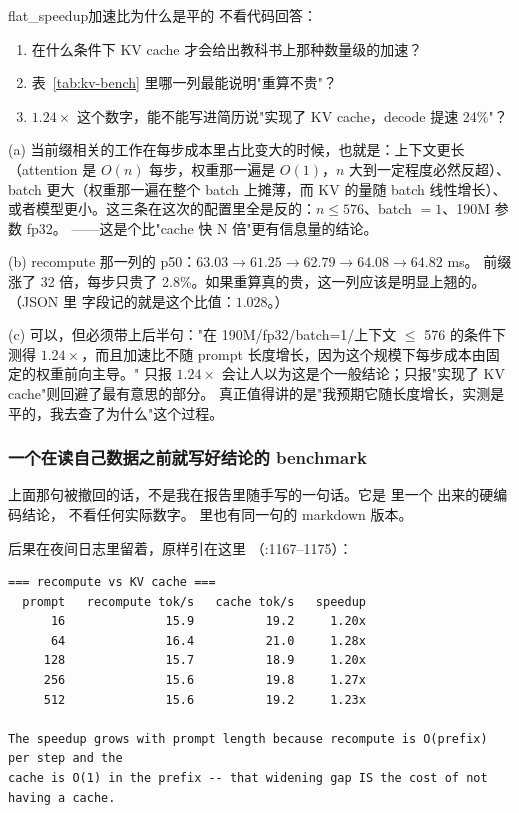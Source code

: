 \begin{checkpoint}{flat_speedup}{加速比为什么是平的}
不看代码回答：
\begin{enumerate}[label=(\alph*)]
  \item 在什么条件下 KV cache 才会给出教科书上那种数量级的加速？
  \item 表~\ref{tab:kv-bench} 里哪一列最能说明"重算不贵"？
  \item $1.24\times$ 这个数字，能不能写进简历说"实现了 KV cache，decode 提速 24\%"？
\end{enumerate}

\ifshowanswers
\tcblower
\answer (a) 当前缀相关的工作在每步成本里占比变大的时候，也就是：上下文更长
（attention 是 $O(n)$ 每步，权重那一遍是 $O(1)$，$n$ 大到一定程度必然反超）、
batch 更大（权重那一遍在整个 batch 上摊薄，而 KV 的量随 batch 线性增长）、
或者模型更小。这三条在这次的配置里全是反的：$n \le 576$、batch $=1$、190M 参数 fp32。
——这是个比"cache 快 N 倍"更有信息量的结论。

(b) recompute 那一列的 p50：$63.03 \to 61.25 \to 62.79 \to 64.08 \to 64.82$ ms。
前缀涨了 32 倍，每步只贵了 2.8\%。如果重算真的贵，这一列应该是明显上翘的。
（JSON 里  字段记的就是这个比值：$1.028$。）

(c) 可以，但必须带上后半句："在 190M/fp32/batch=1/上下文 $\le$ 576 的条件下测得
$1.24\times$，而且加速比不随 prompt 长度增长，因为这个规模下每步成本由固定的权重前向主导。"
只报 $1.24\times$ 会让人以为这是个一般结论；只报"实现了 KV cache"则回避了最有意思的部分。
真正值得讲的是"我预期它随长度增长，实测是平的，我去查了为什么"这个过程。
\fi
\end{checkpoint}

\subsubsection{一个在读自己数据之前就写好结论的 benchmark}

上面那句被撤回的话，不是我在报告里随手写的一句话。它是
 里一个 出来的硬编码结论，
不看任何实际数字。 里也有同一句的 markdown 版本。

后果在夜间日志里留着，原样引在这里
（:1167--1175）：

\begin{lstlisting}[style=hlshell]
=== recompute vs KV cache ===
  prompt   recompute tok/s   cache tok/s   speedup
      16              15.9          19.2     1.20x
      64              16.4          21.0     1.28x
     128              15.7          18.9     1.20x
     256              15.6          19.8     1.27x
     512              15.6          19.2     1.23x

The speedup grows with prompt length because recompute is O(prefix) per step and the
cache is O(1) in the prefix -- that widening gap IS the cost of not having a cache.
\end{lstlisting}

